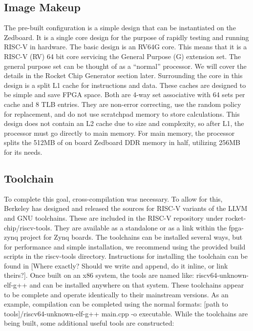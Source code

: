 \documentclass[journal]{IEEEtran}
\begin{document}
\subsection{Image Makeup}
The pre-built configuration is a simple design that can be instantiated on the Zedboard. It is a single core design for the purpose of rapidly testing and running RISC-V in hardware. The basic design is an RV64G core. This means that it is a RISC-V (RV) 64 bit core servicing the General Purpose (G) extension set. The general purpose set can be thought of as a ``normal'' processor. We will cover the details in the Rocket Chip Generator section later. \newline
Surrounding the core in this design is a split L1 cache for instructions and data. These caches are designed to be simple and save FPGA space. Both are 4-way set associative with 64 sets per cache and 8 TLB entries. They are non-error correcting, use the random policy for replacement, and do not use scratchpad memory to store calculations. \newline
This design does not contain an L2 cache due to size and complexity, so after L1, the processor must go directly to main memory. For main memory, the processor splits the 512MB of on board Zedboard DDR memory in half, utilizing 256MB for its needs.

\subsection{Toolchain}
To complete this goal, cross-compilation was necessary. To allow for this, Berkeley has designed and released the sources for RISC-V variants of the LLVM and GNU toolchains. These are included in the RISC-V repository under rocket-chip/riscv-tools. They are available as a standalone or as a link within the fpga-zynq project for Zynq boards. The toolchains can be installed several ways, but for performance and simple installation, we recommend using the provided build scripts in the riscv-tools directory. Instructions for installing the toolchain can be found in [Where exactly? Should we write and append, do it inline, or link theirs?]. Once built on an x86 system, the tools are named like: riscv64-unknown-elf-g++ and can be installed anywhere on that system. These toolchains appear to be complete and operate identically to their mainstream versions. As an example, compilation can be completed using the normal formats: [path to tools]/riscv64-unknown-elf-g++ main.cpp -o executable. \newline \newline While the toolchains are being built, some additional useful tools are constructed:\newline
\end{document}
